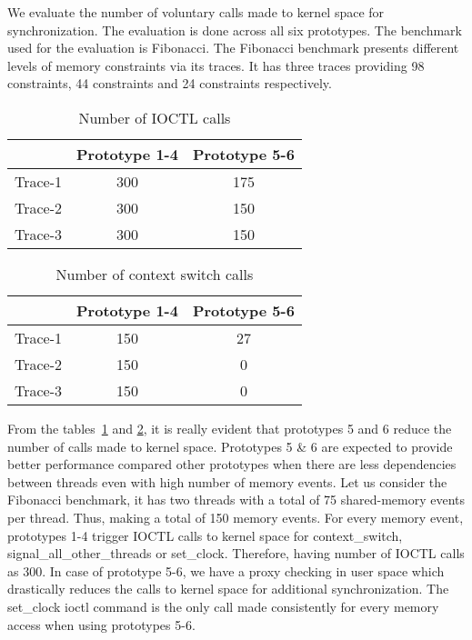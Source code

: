 We evaluate the number of voluntary calls made to kernel space for synchronization. 
The evaluation is done across all six prototypes. 
The benchmark used for the evaluation is Fibonacci. 
The Fibonacci benchmark presents different levels of memory constraints via its traces. 
It has three traces providing 98 constraints, 44 constraints and 24 constraints respectively.

\begin{table}
\begin{center}
 \begin{tabular}{|c c c|} 
 \hline
 & Prototype 1-4 & Prototype 5-6\\ %
 \hline
 Trace-1 & 300 & 175\\ 
 Trace-2 & 300 & 150\\
 Trace-3 & 300 & 150\\
 \hline
\end{tabular}
\end{center}
\caption{Number of IOCTL calls}
\label{num_ioctls}
\end{table}
\begin{table}
\begin{center}
 \begin{tabular}{|c c c|} 
 \hline
 & Prototype 1-4 & Prototype 5-6\\ %
 \hline
 Trace-1 & 150 & 27\\ 
 Trace-2 & 150 & 0\\
 Trace-3 & 150 & 0\\
 \hline
\end{tabular}
\end{center}
\caption{Number of context switch calls}
\label{num_ctxts}
\end{table}

From the tables~\ref{num_ioctls} and \ref{num_ctxts}, it is really evident that prototypes 5 and 6 reduce the number of calls made to kernel space. 
Prototypes 5 \& 6 are expected to provide better performance compared other prototypes when there are less dependencies between threads even with high number of memory events. 
Let us consider the Fibonacci benchmark, it has two threads with a total of 75 shared-memory events per thread. 
Thus, making a total of 150 memory events. 
For every memory event, prototypes 1-4 trigger IOCTL calls to kernel space for context\_switch, signal\_all\_other\_threads or set\_clock. 
Therefore, having number of IOCTL calls as 300. 
In case of prototype 5-6, we have a proxy checking in user space which drastically reduces the calls to kernel space for additional synchronization. 
The set\_clock ioctl command is the only call made consistently for every memory access when using prototypes 5-6.

